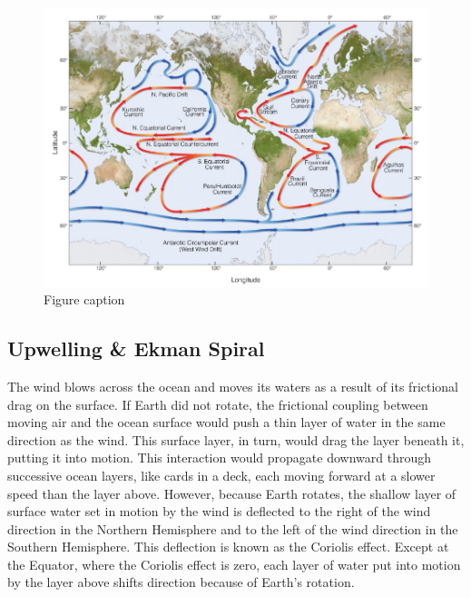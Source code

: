\documentclass[12pt,oneside]{book}
\begin{document}
\begin{figure}

{\centering \includegraphics[width=0.8\linewidth]{figures/Figure531b} 

}

\caption{Figure caption}\label{fig:Fig531b}
\end{figure}

\subsection{Upwelling \& Ekman Spiral}\label{upwelling-ekman-spiral}

The wind blows across the ocean and moves its waters as a result of its
frictional drag on the surface. If Earth did not rotate, the frictional
coupling between moving air and the ocean surface would push a thin
layer of water in the same direction as the wind. This surface layer, in
turn, would drag the layer beneath it, putting it into motion. This
interaction would propagate downward through successive ocean layers,
like cards in a deck, each moving forward at a slower speed than the
layer above. However, because Earth rotates, the shallow layer of
surface water set in motion by the wind is deflected to the right of the
wind direction in the Northern Hemisphere and to the left of the wind
direction in the Southern Hemisphere. This deflection is known as the
Coriolis effect. Except at the Equator, where the Coriolis effect is
zero, each layer of water put into motion by the layer above shifts
direction because of Earth's rotation.
\end{document}

